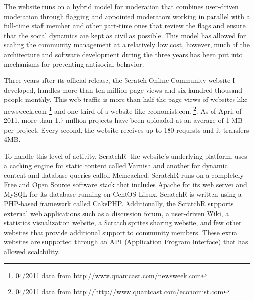 The website runs on a hybrid model for moderation that combines user-driven moderation through flagging and appointed moderators working in parallel with a full-time staff member and other part-time ones that review the flags and ensure that the social dynamics are kept as civil as possible. 
This model has allowed for scaling the community management at a relatively low cost, however, much of the architecture and software development during the three years has been put into mechanisms for preventing antisocial behavior.

Three years after its official release, the Scratch Online Community website I developed, handles more than ten million page views and six hundred-thousand people monthly.
This web traffic is more than half the page views of websites like newsweek.com \footnote{04/2011 data from http://www.quantcast.com/newsweek.com} and one-third of a website like economist.com \footnote{04/2011 data from http://http://www.quantcast.com/economist.com}.
As of April of 2011, more than 1.7 million projects have been uploaded at an average of 1 MB per project. 
Every second, the website receives up to 180 requests and it transfers 4MB.

To handle this level of activity, ScratchR, the website's underlying platform, uses a caching engine for static content called Varnish and another for dynamic content and database queries called Memcached. 
ScratchR runs on a completely Free and Open Source software stack that includes Apache for its web server and MySQL for its database running on CentOS Linux. 
ScratchR is written using a PHP-based framework called CakePHP.
Additionally, the ScratchR supports external  web applications such as a discussion forum, a user-driven Wiki, a statistics visualization website, a Scratch sprites sharing website, and few other websites that provide additional support to community members. 
These extra websites are supported through an API (Application Program Interface) that has allowed scalability.
